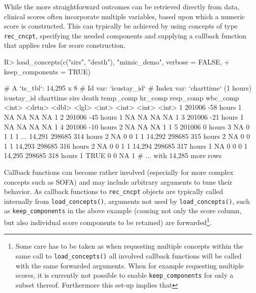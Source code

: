 \documentclass[
  notitle]{jss}
\begin{document}
While the more straightforward outcomes can be retrieved directly from
data, clinical scores often incorporate multiple variables, based upon
which a numeric score is constructed. This can typically be achieved by
using concepts of type \texttt{rec\_cncpt}, specifying the needed
components and supplying a callback function that applies rules for
score construction.

\begin{CodeChunk}
\begin{CodeInput}
R> load_concepts(c("sirs", "death"), "mimic_demo", verbose = FALSE,
+               keep_components = TRUE)
\end{CodeInput}
\begin{CodeOutput}
# A `ts_tbl`: 14,295 x 8
# Id var:     `icustay_id`
# Index var:  `charttime` (1 hours)
       icustay_id charttime  sirs death temp_comp hr_comp resp_comp wbc_comp
            <int> <drtn>    <dbl> <lgl>     <int>   <int>     <int>    <int>
     1     201006 -58 hours     1 NA           NA      NA        NA        1
     2     201006 -45 hours     1 NA           NA      NA        NA        1
     3     201006 -21 hours     1 NA           NA      NA        NA        1
     4     201006 -10 hours     2 NA           NA      NA         1        1
     5     201006   0 hours     3 NA            0       1         1        1
   ...
14,291     298685 314 hours     2 NA            0       0         1        1
14,292     298685 315 hours     2 NA            0       0         1        1
14,293     298685 316 hours     2 NA            0       0         1        1
14,294     298685 317 hours     1 NA            0       0         0        1
14,295     298685 318 hours     1 TRUE          0       0        NA        1
# ... with 14,285 more rows
\end{CodeOutput}
\end{CodeChunk}

Callback functions can become rather involved (especially for more
complex concepts such as SOFA) and may include arbitrary arguments to
tune their behavior. As callback functions to \texttt{rec\_cncpt}
objects are typically called internally from \texttt{load\_concepts()},
arguments not used by \texttt{load\_concepts()}, such as
\texttt{keep\_components} in the above example (causing not only the
score column, but also individual score components to be retained) are
forwarded\footnote{Some care has to be taken as when requesting multiple
  concepts within the same call to \texttt{load\_concepts()} all
  involved callback functions will be called with the same forwarded
  arguments. When for example requesting multiple scores, it is
  currently not possible to enable \texttt{keep\_components} for only a
  subset thereof. Furthermore this set-up implies that }.
\end{document}
